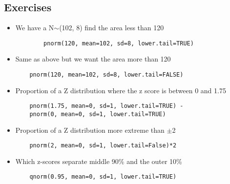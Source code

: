 


























\subsection{Exercises}  

\begin{itemize}
    \item We have a N$\sim$(102, 8) find the area less than 120

    \begin{verbatim}
        pnorm(120, mean=102, sd=8, lower.tail=TRUE)
    \end{verbatim}

\item Same as above but we want the area more than 120

\begin{verbatim}
    pnorm(120, mean=102, sd=8, lower.tail=FALSE)
\end{verbatim}

\item Proportion of a Z distribution where the z score is between 0 and 1.75

\begin{verbatim}
    pnorm(1.75, mean=0, sd=1, lower.tail=TRUE) - 
    pnorm(0, mean=0, sd=1, lower.tail=TRUE)
\end{verbatim}

\item Proportion of a Z distribution more extreme than $\pm$2

\begin{verbatim}
    pnorm(2, mean=0, sd=1, lower.tail=False)*2
\end{verbatim}

\item Which z-scores separate middle 90\% and the outer 10\%

\begin{verbatim}
    qnorm(0.95, mean=0, sd=1, lower.tail=TRUE)
\end{verbatim}


\end{itemize}
